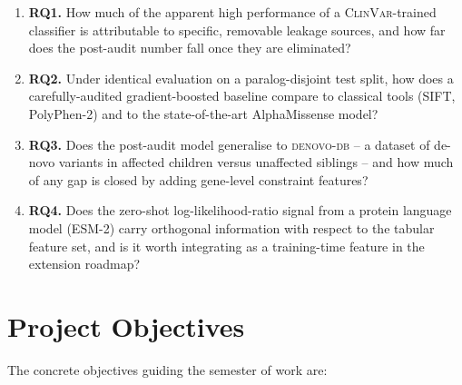 \documentclass[11pt,a4paper,oneside]{report}
\begin{document}
\begin{enumerate}
\item \textbf{RQ1.} How much of the apparent high performance
of a \textsc{ClinVar}-trained classifier is attributable to
specific, removable leakage sources, and how far does the
post-audit number fall once they are eliminated?
\item \textbf{RQ2.} Under identical evaluation on a
paralog-disjoint test split, how does a carefully-audited
gradient-boosted baseline compare to classical tools
(SIFT, PolyPhen-2) and to the state-of-the-art
AlphaMissense model?
\item \textbf{RQ3.} Does the post-audit model generalise to
\textsc{denovo-db} -- a dataset of de-novo variants in
affected children versus unaffected siblings -- and how
much of any gap is closed by adding gene-level constraint
features?
\item \textbf{RQ4.} Does the zero-shot log-likelihood-ratio
signal from a protein language model (ESM-2) carry
orthogonal information with respect to the tabular feature
set, and is it worth integrating as a training-time feature
in the extension roadmap?
\end{enumerate}

\section{Project Objectives}
\label{sec:intro-objectives}

The concrete objectives guiding the semester of work are:
\end{document}
